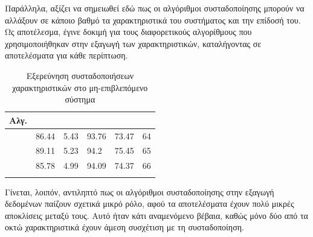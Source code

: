 Παράλληλα, αξίζει να σημειωθεί εδώ πως οι αλγόριθμοι συσταδοποίησης μπορούν να αλλάξουν σε κάποιο βαθμό τα χαρακτηριστικά του συστήματος και την επίδοσή του. Ως αποτέλεσμα, έγινε δοκιμή για τους διαφορετικούς αλγορίθμους που χρησιμοποιήθηκαν στην εξαγωγή των χαρακτηριστικών, καταλήγοντας σε αποτελέσματα για κάθε περίπτωση.
\newpage
\begin{center}
\begin{longtabu} to 0.8\textwidth { | X[c] || X[c] | X[c] | X[c] | X[c] | X[c] |  }
 \hline
 Αλγ.&   &  &  &  & \\
\hline
  & 86.44	&	5.43 &	93.76 &	73.47 &	64\\
\hline
 & 89.11	&	5.23 &	94.2 &	75.45 &	65\\ 
 \hline
   & 85.78	&	4.99 &	94.09 &	74.37 &	66\\
\hline
\caption{Εξερεύνηση συσταδοποιήσεων χαρακτηριστικών στο μη-επιβλεπόμενο σύστημα}
\label{tab:testclusterunsup}
\end{longtabu}
\end{center}
\par Γίνεται, λοιπόν, αντιληπτό πως οι αλγόριθμοι συσταδοποίησης στην εξαγωγή δεδομένων παίζουν σχετικά μικρό ρόλο, αφού τα αποτελέσματα έχουν πολύ μικρές αποκλίσεις μεταξύ τους. Αυτό ήταν κάτι αναμενόμενο βέβαια, καθώς μόνο δύο από τα οκτώ χαρακτηριστικά έχουν άμεση συσχέτιση με τη συσταδοποίηση.\par
